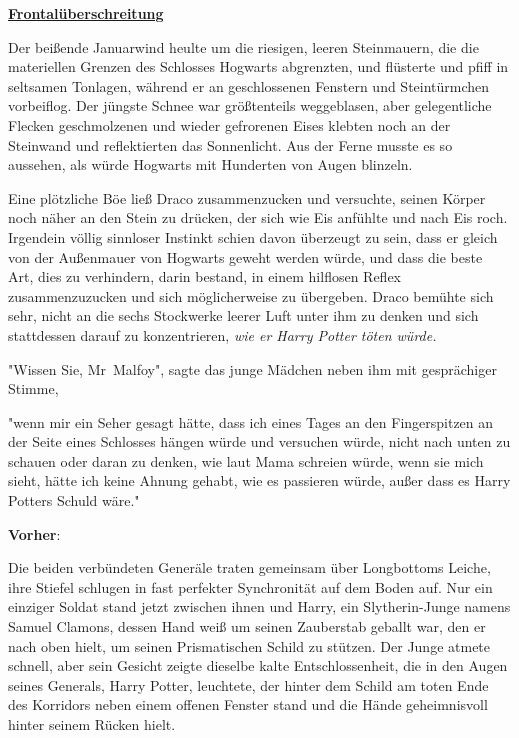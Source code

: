

\hypertarget{frontaluxfcberschreitungen}{%

\textbf{\uline{Frontalüberschreitung}}

Der beißende Januarwind heulte um die riesigen, leeren Steinmauern, die die materiellen Grenzen des Schlosses Hogwarts abgrenzten, und flüsterte und pfiff in seltsamen Tonlagen, während er an geschlossenen Fenstern und Steintürmchen vorbeiflog. Der jüngste Schnee war größtenteils weggeblasen, aber gelegentliche Flecken geschmolzenen und wieder gefrorenen Eises klebten noch an der Steinwand und reflektierten das Sonnenlicht. Aus der Ferne musste es so aussehen, als würde Hogwarts mit Hunderten von Augen blinzeln.

Eine plötzliche Böe ließ Draco zusammenzucken und versuchte, seinen Körper noch näher an den Stein zu drücken, der sich wie Eis anfühlte und nach Eis roch. Irgendein völlig sinnloser Instinkt schien davon überzeugt zu sein, dass er gleich von der Außenmauer von Hogwarts geweht werden würde, und dass die beste Art, dies zu verhindern, darin bestand, in einem hilflosen Reflex zusammenzuzucken und sich möglicherweise zu übergeben. Draco bemühte sich sehr, nicht an die sechs Stockwerke leerer Luft unter ihm zu denken und sich stattdessen darauf zu konzentrieren, \emph{wie er Harry Potter töten würde.}

"Wissen Sie, Mr~Malfoy", sagte das junge Mädchen neben ihm mit gesprächiger Stimme,

"wenn mir ein Seher gesagt hätte, dass ich eines Tages an den Fingerspitzen an der Seite eines Schlosses hängen würde und versuchen würde, nicht nach unten zu schauen oder daran zu denken, wie laut Mama schreien würde, wenn sie mich sieht, hätte ich keine Ahnung gehabt, wie es passieren würde, außer dass es Harry Potters Schuld wäre."

\textbf{Vorher}:

Die beiden verbündeten Generäle traten gemeinsam über Longbottoms Leiche, ihre Stiefel schlugen in fast perfekter Synchronität auf dem Boden auf. Nur ein einziger Soldat stand jetzt zwischen ihnen und Harry, ein Slytherin-Junge namens Samuel Clamons, dessen Hand weiß um seinen Zauberstab geballt war, den er nach oben hielt, um seinen Prismatischen Schild zu stützen. Der Junge atmete schnell, aber sein Gesicht zeigte dieselbe kalte Entschlossenheit, die in den Augen seines Generals, Harry Potter, leuchtete, der hinter dem Schild am toten Ende des Korridors neben einem offenen Fenster stand und die Hände geheimnisvoll hinter seinem Rücken hielt.

}
